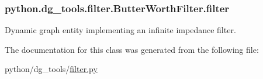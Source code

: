 \subsubsection[{\texorpdfstring{filter}{filter}}]{\setlength{\rightskip}{0pt plus 5cm}python.\+dg\+\_\+tools.\+filter.\+Butter\+Worth\+Filter.\+filter}\hypertarget{classpython_1_1dg__tools_1_1filter_1_1ButterWorthFilter_aaa37fb9c14becc324528c1a5eb7a0a86}{}\label{classpython_1_1dg__tools_1_1filter_1_1ButterWorthFilter_aaa37fb9c14becc324528c1a5eb7a0a86}


Dynamic graph entity implementing an infinite impedance filter. 



The documentation for this class was generated from the following file\+:\begin{DoxyCompactItemize}
\item 
python/dg\+\_\+tools/\hyperlink{filter_8py}{filter.\+py}\end{DoxyCompactItemize}
